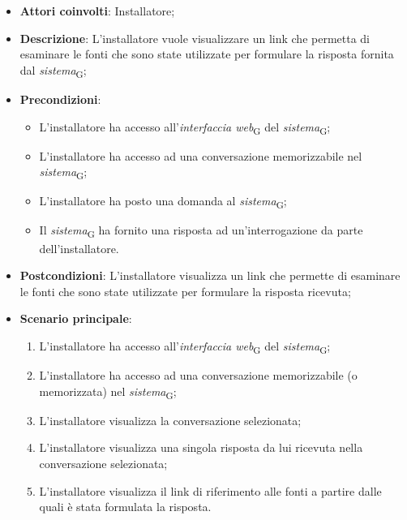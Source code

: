 \begin{itemize}
    \item \textbf{Attori coinvolti}: Installatore;
    \item \textbf{Descrizione}: L'installatore vuole visualizzare un link che permetta di esaminare le fonti che sono state utilizzate per formulare la risposta fornita dal \textit{sistema}\textsubscript{G};
    \item \textbf{Precondizioni}: 
    \begin{itemize}
        \item L’installatore ha accesso all’\textit{interfaccia web}\textsubscript{G} del \textit{sistema}\textsubscript{G};
        \item L’installatore ha accesso ad una conversazione memorizzabile nel \textit{sistema}\textsubscript{G};
        \item L'installatore ha posto una domanda al \textit{sistema}\textsubscript{G};
        \item Il \textit{sistema}\textsubscript{G} ha fornito una risposta ad un’interrogazione da parte dell’installatore.
    \end{itemize}
    \item \textbf{Postcondizioni}: L'installatore visualizza un link che permette di esaminare le fonti che sono state utilizzate per formulare la risposta ricevuta;
    \item \textbf{Scenario principale}:
    \begin{enumerate}
        \item L’installatore ha accesso all’\textit{interfaccia web}\textsubscript{G} del \textit{sistema}\textsubscript{G};
        \item L’installatore ha accesso ad una conversazione memorizzabile (o memorizzata) nel \textit{sistema}\textsubscript{G};
        \item L'installatore visualizza la conversazione selezionata;
        \item L'installatore visualizza una singola risposta da lui ricevuta nella conversazione selezionata;
        \item L'installatore visualizza il link di riferimento alle fonti a partire dalle quali è stata formulata la risposta.
    \end{enumerate}
\end{itemize}

